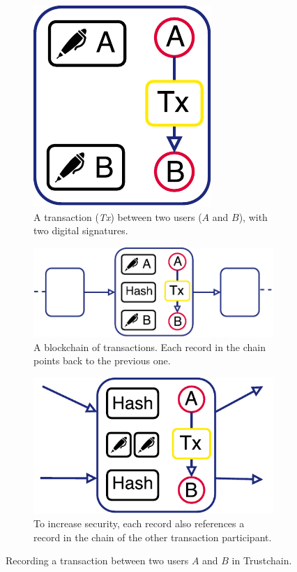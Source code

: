\begin{figure}[t]
	\centering
	\begin{subfigure}[t]{.33\textwidth}
		\centering
		\captionsetup{width=.9\linewidth}
		\includegraphics[width=.35\linewidth]{iom/assets/trustchain_tutorial_1}
		\caption{A transaction (\emph{Tx}) between two users ($ A $ and $ B $), with two digital signatures.}
		\label{fig:trustchain_tutorial_1}
	\end{subfigure}%
	\begin{subfigure}[t]{.33\textwidth}
		\centering
		\captionsetup{width=.9\linewidth}
		\includegraphics[width=\linewidth]{iom/assets/trustchain_tutorial_2}
		\caption{A blockchain of transactions. Each record in the chain points back to the previous one.}
		\label{fig:trustchain_tutorial_2}
	\end{subfigure}%
	\begin{subfigure}[t]{.33\textwidth}
		\centering
		\captionsetup{width=.9\linewidth}
		\includegraphics[width=.7\linewidth]{iom/assets/trustchain_tutorial_3}
		\caption{To increase security, each record also references a record in the chain of the other transaction participant.}
		\label{fig:trustchain_tutorial_3}
	\end{subfigure}
	\caption{Recording a transaction between two users $ A $ and $ B $ in Trustchain.}
	\label{fig:trustchain_tutorial}
\end{figure}

